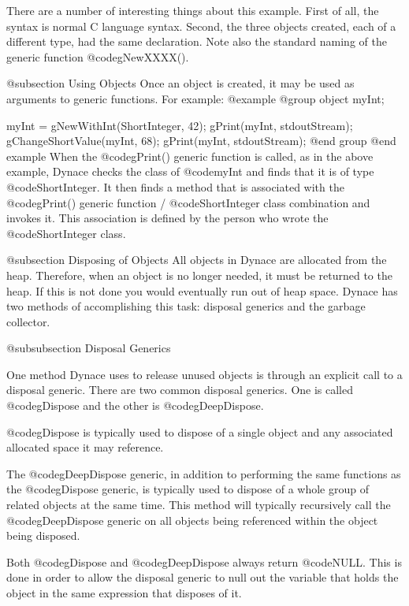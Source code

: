 There are a number of interesting things about this example.  First of
all, the syntax is normal C language syntax.  Second, the three objects
created, each of a different type, had the same declaration.  Note also
the standard naming of the generic function @code{gNewXXXX()}.

@subsection Using Objects
Once an object is created, it may be used as arguments to generic functions.
For example:
@example
@group
        object   myInt;

        myInt = gNewWithInt(ShortInteger, 42);
        gPrint(myInt, stdoutStream);
        gChangeShortValue(myInt, 68);
        gPrint(myInt, stdoutStream);
@end group
@end example
When the @code{gPrint()} generic function is called, as in the above
example, Dynace checks the class of @code{myInt} and finds that it is of type
@code{ShortInteger}.  It then finds a method that is associated with the
@code{gPrint()} generic function / @code{ShortInteger} class combination
and invokes it.  This association is defined by the person who wrote the
@code{ShortInteger} class.

@subsection Disposing of Objects
All objects in Dynace are allocated from the heap.  Therefore, when an object
is no longer needed, it must be returned to the heap.  If this is not
done you would eventually run out of heap space.  Dynace has two methods
of accomplishing this task: disposal generics and the garbage collector.

@subsubsection Disposal Generics

One method Dynace uses to release unused objects is through an explicit
call to a disposal generic.  There are two common disposal generics.
One is called @code{gDispose} and the other is @code{gDeepDispose}.

@code{gDispose} is typically used to dispose of a single object and any
associated allocated space it may reference.

The @code{gDeepDispose} generic, in addition to performing the same
functions as the @code{gDispose} generic, is typically used to dispose
of a whole group of related objects at the same time.  This method will
typically recursively call the @code{gDeepDispose} generic on all
objects being referenced within the object being disposed.

Both @code{gDispose} and @code{gDeepDispose} always return @code{NULL}.
This is done in order to allow the disposal generic to null out the
variable that holds the object in the same expression that disposes
of it.

